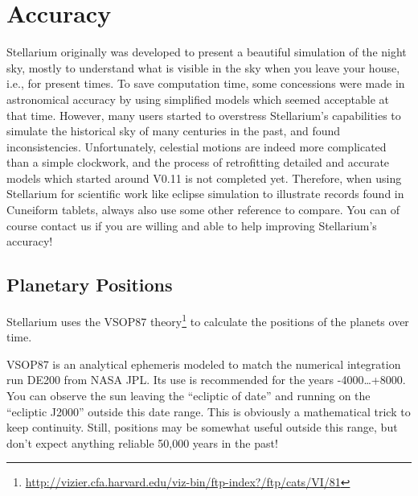 


\chapter{Accuracy}
\label{ch:Accuracy}

Stellarium originally was developed to present a beautiful simulation
of the night sky, mostly to understand what is visible in the sky when
you leave your house, i.e., for present times. To save computation
time, some concessions were made in astronomical accuracy by using
simplified models which seemed acceptable at that time. However, many
users started to overstress Stellarium's capabilities to simulate the
historical sky of many centuries in the past, and found
inconsistencies.  Unfortunately, celestial motions are indeed more
complicated than a simple clockwork, and the process of retrofitting
detailed and accurate models which started around V0.11 is not
completed yet. Therefore, when using Stellarium for scientific work
like eclipse simulation to illustrate records found in Cuneiform
tablets, always also use some other reference to compare. You can of
course contact us if you are willing and able to help improving
Stellarium's accuracy!


\section{Planetary Positions}
\label{sec:Accuracy:Planets}

Stellarium uses the VSOP87 \cite{1988A&A...202..309B}
theory\footnote{\url{http://vizier.cfa.harvard.edu/viz-bin/ftp-index?/ftp/cats/VI/81}}
to calculate the positions of the planets over time.

VSOP87 is an analytical ephemeris modeled to match the numerical
integration run DE200 from NASA JPL. Its use is recommended for the
years -4000\ldots+8000. You can observe the sun leaving the ``ecliptic
of date'' and running on the ``ecliptic J2000'' outside this date
range. This is obviously a mathematical trick to keep
continuity. Still, positions may be somewhat useful outside this
range, but don't expect anything reliable 50,000 years in the past!


